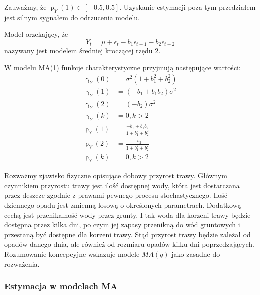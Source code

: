 \documentclass[10pt,a4paper]{book}
\newcommand{\tsAutoCovariance}[3][\gamma]{\operatorname{#1}_{#2} \left({#3}\right)}
\newcommand{\tsAutoCorellation}[3][\rho]{\operatorname{#1}_{#2} \left({#3}\right)}
\begin{document}
\begin{remark}
Zauważmy, że $\tsAutoCorellation{Y}{1} \in [-0.5,0.5]$. Uzyskanie estymacji poza tym przedziałem jest silnym sygnałem do odrzucenia modelu.
\end{remark}

\begin{definition}[Model $MA(2)$] 
Model orzekający, że 
$$
Y_t = \mu + \epsilon_t - b_1 \epsilon_{t-1} -b_2 \epsilon_{t-2}
$$
nazywany jest modelem średniej kroczącej rzędu 2.
\end{definition}

\begin{proposition}
W modelu MA(1) funkcje charakterystyczne przyjmują następujące wartości:
\begin{align*}
\tsAutoCovariance{Y}{0}&= \sigma^2 (1+ b_1^2 + b_2^2)\\
\tsAutoCovariance{Y}{1}&= (-b_1 + b_1 b_2) \sigma^2\\
\tsAutoCovariance{Y}{2}&= (-b_2 ) \sigma^2 \\
\tsAutoCovariance{Y}{k}&= 0, k> 2\\
\tsAutoCorellation{Y}{1}&= \frac{-b_1 + b_1 b_2}{1+ b_1^2 + b_2^2}\\
\tsAutoCorellation{Y}{2}&= \frac{-b_2 }{1+ b_1^2 + b_2^2}\\
\tsAutoCorellation{Y}{k}&= 0, k >2
\end{align*}
\end{proposition}

\begin{example}
Rozważmy zjawisko fizyczne opisujące dobowy przyrost trawy. Głównym czynnikiem przyrostu trawy jest ilość dostępnej wody, która jest dostarczana przez deszcze zgodnie z prawami pewnego procesu stochastycznego. Ilość dziennego opadu jest zmienną losową o określonych parametrach. Dodatkową cechą jest przenikalność wody przez grunty. I tak woda dla korzeni trawy będzie dostępna przez kilka dni, po czym jej zapasy przenikną do wód gruntowych i przestaną być dostępne dla korzeni trawy. Stąd przyrost trawy będzie zależał od opadów danego dnia, ale również od rozmiaru opadów kilku dni poprzedzających. Rozumowanie koncepcyjne wskazuje modele $MA(q)$ jako zasadne do rozważenia.
\end{example}

\subsubsection{Estymacja w modelach MA}
\end{document}

